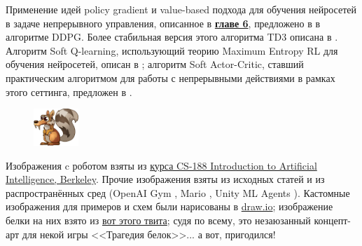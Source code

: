 Применение идей policy gradient и value-based подхода для обучения нейросетей в задаче непрерывного управления, описанное в \underline{\textbf{главе 6}}, предложено в \cite{lillicrap2015continuous} в алгоритме DDPG. Более стабильная версия этого алгоритма TD3 описана в \cite{fujimoto2018addressing}. Алгоритм Soft Q-learning, использующий теорию Maximum Entropy RL для обучения нейросетей, описан в \cite{haarnoja2017reinforcement}; алгоритм Soft Actor-Critic, ставший практическим алгоритмом для работы с непрерывными действиями в рамках этого сеттинга, предложен в \cite{haarnoja2018soft}. 

\begin{figure}
\vspace{-0.25cm}
\centering
\includegraphics[width=0.15\textwidth]{Images/Scrat.png}
\vspace{-0.5cm}
\end{figure}

Изображения c роботом взяты из \href{https://inst.eecs.berkeley.edu/~cs188/fa20/}{курса CS-188 Introduction to Artificial Intelligence, Berkeley}. Прочие изображения взяты из исходных статей и из распространённых сред (OpenAI Gym \cite{brockman2016openai}, Mario \cite{gym-super-mario-bros}, Unity ML Agents \cite{juliani2018unity}). Кастомные изображения для примеров и схем были нарисованы в \href{https://www.draw.io/}{draw.io}; изображение белки на них взято из \href{https://twitter.com/racefornuts/status/690043558208913408}{вот этого твита}; судя по всему, это незаюзанный концепт-арт для некой игры <<Трагедия белок>>... а вот, пригодился!

